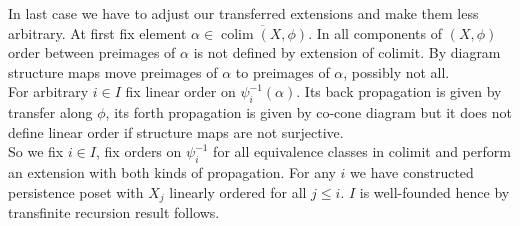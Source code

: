 \begin{pf}
  In last case we have to adjust our transferred extensions and make them less arbitrary. At first fix element $\alpha \in \overline{\operatorname{colim}(X, \phi)}$. In all components of $(X,\phi)$ order between preimages of $\alpha$ is not defined by extension of colimit. By diagram structure maps move preimages of $\alpha$ to preimages of $\alpha$, possibly not all.\\

  For arbitrary $i \in I$ fix linear order on $\psi_i^{-1}(\alpha)$. Its back propagation is given by transfer along $\phi$, its forth propagation is given by co-cone diagram but it does not define linear order if structure maps are not surjective.\\

  So we fix $i \in I$, fix orders on $\psi_i^{-1}$ for all equivalence classes in colimit and perform an extension with both kinds of propagation. For any $i$ we have constructed persistence poset with $X_j$ linearly ordered for all $j \leq i$. $I$ is well-founded hence by transfinite recursion result follows.
\end{pf}

%
%
%
